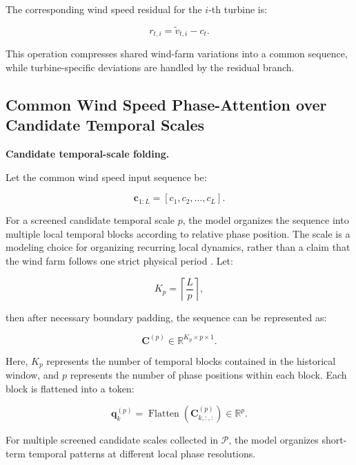 The corresponding wind speed residual for the $i$-th turbine is:

\begin{equation}
r_{t,i} = \tilde{v}_{t,i}-c_t.
\end{equation}

This operation compresses shared wind-farm variations into a common sequence, while turbine-specific deviations are handled by the residual branch.

\subsection{Common Wind Speed Phase-Attention over Candidate Temporal Scales}

\textbf{Candidate temporal-scale folding.}

Let the common wind speed input sequence be:

\begin{equation}
\mathbf{c}_{1:L} = [c_1, c_2, \ldots, c_L].
\end{equation}

For a screened candidate temporal scale $p$, the model organizes the sequence into multiple local temporal blocks according to relative phase position. The scale is a modeling choice for organizing recurring local dynamics, rather than a claim that the wind farm follows one strict physical period \cite{Autoformer2021DecompositionAutoCorrelation,FEDformer2022FrequencyEnhanced}. Let:

\begin{equation}
K_p = \left\lceil\frac{L}{p}\right\rceil,
\end{equation}

then after necessary boundary padding, the sequence can be represented as:

\begin{equation}
\mathbf{C}^{(p)} \in \mathbb{R}^{K_p\times p\times 1}.
\end{equation}

Here, $K_p$ represents the number of temporal blocks contained in the historical window, and $p$ represents the number of phase positions within each block. Each block is flattened into a token:

\begin{equation}
\mathbf{q}^{(p)}_k = \operatorname{Flatten} \left( \mathbf{C}^{(p)}_{k,:,:} \right) \in \mathbb{R}^{p}.
\end{equation}

For multiple screened candidate scales collected in $\mathcal{P}$, the model organizes short-term temporal patterns at different local phase resolutions.

